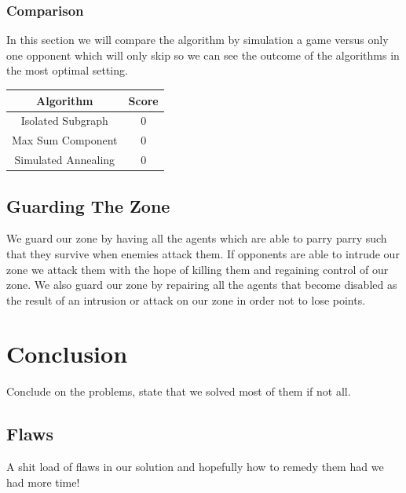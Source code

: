 \documentclass[11pt]{article}
\begin{document}
\subsubsection{Comparison}
In this section we will compare the algorithm by simulation a game versus only one opponent which will only skip so we can see the outcome of the algorithms in the most optimal setting.
\begin{center}
\begin{tabular}{| c c |}
\hline
Algorithm & Score\\ \hline
Isolated Subgraph & 0 \\
Max Sum Component & 0 \\
Simulated Annealing & 0 \\
\hline
\end{tabular}
\end{center}

\subsection{Guarding The Zone}
We guard our zone by having all the agents which are able to parry parry such that they survive when enemies attack them. If opponents are able to intrude our zone we attack them with the hope of killing them and regaining control of our zone. We also guard our zone by repairing all the agents that become disabled as the result of an intrusion or attack on our zone in order not to lose points.

\section{Conclusion}
Conclude on the problems, state that we solved most of them if not all.

\subsection{Flaws}
A shit load of flaws in our solution and hopefully how to remedy them had we had more time!
\end{document}
